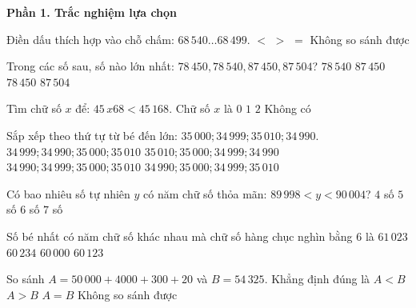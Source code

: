 \textbf{Phần 1. Trắc nghiệm lựa chọn}

\begin{ex} %
Điền dấu thích hợp vào chỗ chấm: $68\,540 \dots 68\,499$.
\choice
{$<$}
{\True $>$}
{$=$}
{Không so sánh được}
\end{ex}

\begin{ex} %
Trong các số sau, số nào lớn nhất: $78\,450, 78\,540, 87\,450, 87\,504$?
\choice
{$78\,540$}
{$87\,450$}
{$78\,450$}
{\True $87\,504$}
\end{ex}

\begin{ex} %
Tìm chữ số $x$ để: $45\,x68 < 45\,168$. Chữ số $x$ là
\choice
{\True $0$}
{$1$}
{$2$}
{Không có}
\end{ex}

\begin{ex} %
Sắp xếp theo thứ tự từ bé đến lớn: $35\,000; 34\,999; 35\,010; 34\,990$.
\choice
{$34\,999; 34\,990; 35\,000; 35\,010$}
{$35\,010; 35\,000; 34\,999; 34\,990$}
{\True $34\,990; 34\,999; 35\,000; 35\,010$}
{$34\,990; 35\,000; 34\,999; 35\,010$}
\end{ex}

\begin{ex} %
Có bao nhiêu số tự nhiên $y$ có năm chữ số thỏa mãn: $89\,998 < y < 90\,004$?
\choice
{$4$ số}
{\True $5$ số}
{$6$ số}
{$7$ số}
\end{ex}

\begin{ex} %
Số bé nhất có năm chữ số khác nhau mà chữ số hàng chục nghìn bằng 6 là
\choice
{$61\,023$}
{$60\,234$}
{$60\,000$}
{\True $60\,123$}
\end{ex}

\begin{ex} %
So sánh $A = 50\,000 + 4000 + 300 + 20$ và $B = 54\,325$. Khẳng định đúng là
\choice
{\True $A < B$}
{$A > B$}
{$A = B$}
{Không so sánh được}
\end{ex}

